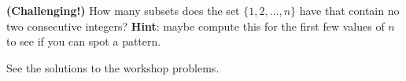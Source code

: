 \documentclass[11pt,dvipsnames]{book}
\numberwithin{figure}{section} %
\numberwithin{table}{section} %
\begin{document}
\begin{exercise} {\bf (Challenging!)} How many subsets does the set $\{1,2, \dots ,n\}$ have that contain no two consecutive integers?  {\bf Hint}: maybe compute this for the first few values of $n$ to see if you can spot a pattern.

\begin{solution}
See the solutions to the workshop problems.
\end{solution}

\end{exercise}

%
%
%
%
%
%
%
%
%
%
%
%
%

%
%
%
%
%
\end{document}
